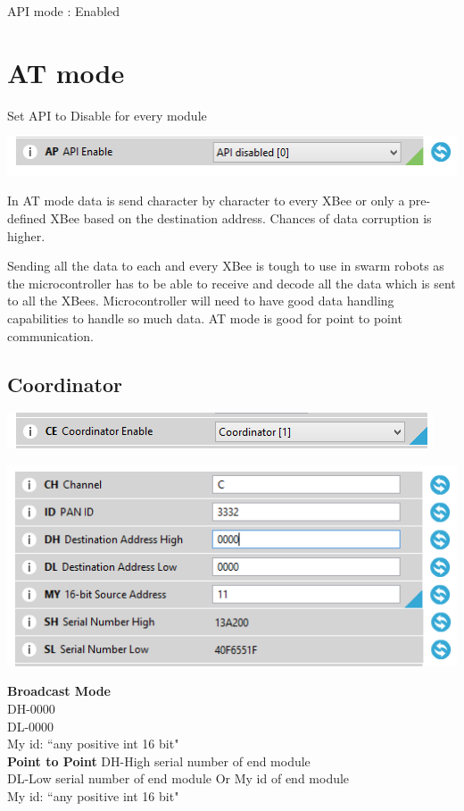 \documentclass[main.tex]{subfiles}
\begin{document}
API mode : Enabled
\pagebreak
\section{AT mode}
Set API to Disable for every module

\noindent\includegraphics[scale=1]{Images/apidisable.png}

In AT mode data is send character by character to every XBee or only a pre-defined XBee based on the destination address.
Chances of data corruption is higher. 

Sending all the data to each and every XBee is tough to use in swarm robots as the microcontroller has to be able to receive and decode all the data which is sent to all the XBees. 
Microcontroller will need to have good data handling capabilities to handle so much data.
AT mode is good for point to point communication.

\subsection{Coordinator}
\includegraphics[scale=1]{Images/corenb.png}

\includegraphics[scale=1]{Images/atcord.png}

\noindent\textbf{Broadcast Mode}\\
DH-0000\\ 
DL-0000 \\
My id: ``any positive int 16 bit"\\

\noindent\textbf{Point to Point}
DH-High serial number of end module\\ 
DL-Low serial number of end module Or My id of end module\\
My id: ``any positive int 16 bit"
\end{document}
